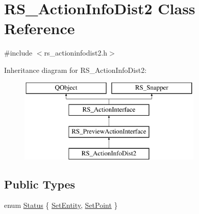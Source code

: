 \hypertarget{classRS__ActionInfoDist2}{\section{R\-S\-\_\-\-Action\-Info\-Dist2 Class Reference}
\label{classRS__ActionInfoDist2}
}


{\ttfamily \#include $<$rs\-\_\-actioninfodist2.\-h$>$}

Inheritance diagram for R\-S\-\_\-\-Action\-Info\-Dist2\-:\begin{figure}[H]
\begin{center}
\leavevmode
\includegraphics[height=4.000000cm]{classRS__ActionInfoDist2}
\end{center}
\end{figure}
\subsection*{Public Types}
\begin{DoxyCompactItemize}
\item 
enum \hyperlink{classRS__ActionInfoDist2_a4672176d63c9f9c88755cb537f709764}{Status} \{ \hyperlink{classRS__ActionInfoDist2_a4672176d63c9f9c88755cb537f709764af0d5602c326e563dad725ce3a2312f73}{Set\-Entity}, 
\hyperlink{classRS__ActionInfoDist2_a4672176d63c9f9c88755cb537f709764ad090aab5223f6c2a1ee01de2079d0eb7}{Set\-Point}
 \}
\end{DoxyCompactItemize}
